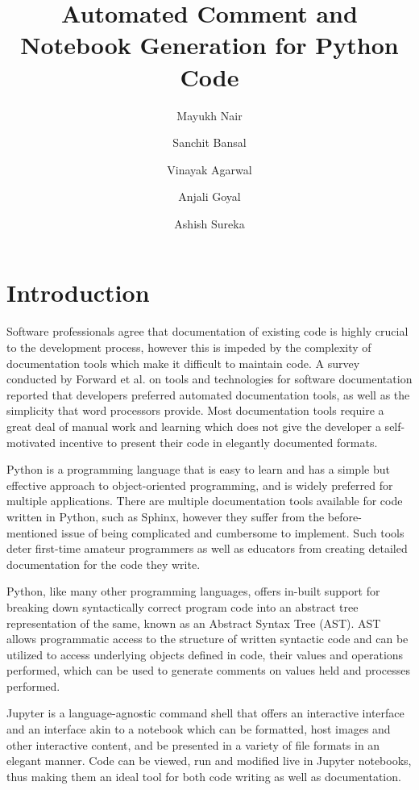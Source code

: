 \documentclass[fleqn,10pt]{wlscirep}
\title{Automated Comment and Notebook Generation for Python Code}
\author[1,+]{Mayukh Nair}
\author[1,+]{Sanchit Bansal}
\author[1,+]{Vinayak Agarwal}
\author[1]{Anjali Goyal}
\author[1,*]{Ashish Sureka}
\affil[1]{Department of Computer Science, Ashoka University, India}
\affil[*]{Corresponding author: Ashish Sureka (ashish.sureka@ashoka.edu.in)}
\affil[+]{these authors contributed equally to this work}
\begin{document}
\flushbottom
\maketitle
%
%
\thispagestyle{empty}

\section*{Introduction}

Software professionals agree that documentation of existing code is highly crucial to the development process, however this is impeded by the complexity of documentation tools which make it difficult to maintain code. A survey conducted by Forward et al. on tools and technologies for software documentation reported that developers preferred automated documentation tools, as well as the simplicity that word processors provide\cite{Forward:2002:RSD:585058.585065}. Most documentation tools require a great deal of manual work and learning which does not give the developer a self-motivated incentive to present their code in elegantly documented formats. 

Python is a programming language that is easy to learn and has a simple but effective approach to object-oriented programming\cite{van2003introduction}, and is widely preferred for multiple applications. There are multiple documentation tools available for code written in Python, such as Sphinx\cite{brandl2009sphinx}, however they suffer from the before-mentioned issue of being complicated and cumbersome to implement. Such tools deter first-time amateur programmers as well as educators from creating detailed documentation for the code they write. 

Python, like many other programming languages, offers in-built support for breaking down syntactically correct program code into an abstract tree representation of the same, known as an Abstract Syntax Tree (AST). AST allows programmatic access to the structure of written syntactic code and can be utilized to access underlying objects defined in code, their values and operations performed, which can be used to generate comments on values held and processes performed.

Jupyter\cite{kluyver2016jupyter} is a language-agnostic command shell that offers an interactive interface and an interface akin to a notebook which can be formatted, host images and other interactive content, and be presented in a variety of file formats in an elegant manner. Code can be viewed, run and modified live in Jupyter notebooks, thus making them an ideal tool for both code writing as well as documentation. 
\end{document}
